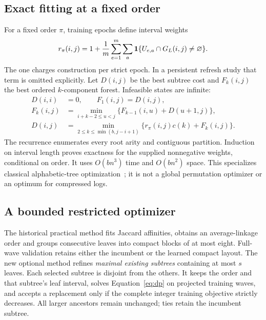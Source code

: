 \documentclass[10pt,journal,compsoc]{IEEEtran}
\theoremstyle{definition}\newtheorem{definition}[theorem]{Definition}
\begin{document}
\subsection{Exact fitting at a fixed order}
For a fixed order $\pi$, training epochs define interval weights
\begin{equation}\label{eq:jweights}
 r_\pi(i,j)=1+\frac1m\sum_{e=1}^m\sum_a
 \mathbf 1\{U_{e,a}\cap G_L(i,j)\ne\varnothing\}.
\end{equation}
The one charges construction per strict epoch. In a persistent refresh study
that term is omitted explicitly.
Let $D(i,j)$ be the best subtree cost and $F_k(i,j)$ the best ordered
$k$-component forest. Infeasible states are infinite:
\begin{align}
 D(i,i)&=0,\qquad F_1(i,j)=D(i,j),\nonumber\\
 F_k(i,j)&=\min_{i+k-2\le u<j}
       \{F_{k-1}(i,u)+D(u+1,j)\},\nonumber\\
 D(i,j)&=\min_{2\le k\le\min(b,j-i+1)}
       \{r_\pi(i,j)c(k)+F_k(i,j)\}.\label{eq:dp}
\end{align}
The recurrence enumerates every root arity and contiguous partition.
Induction on interval length proves exactness for the supplied nonnegative
weights, conditional on order. It uses $O(bn^3)$ time and $O(bn^2)$ space.
This specializes classical alphabetic-tree optimization~\cite{alphabetic};
it is not a global permutation optimizer or an optimum for compressed logs.

\subsection{A bounded restricted optimizer}
The historical practical method fits Jaccard affinities, obtains an
average-linkage order and groups consecutive leaves into compact blocks of
at most eight. Full-wave validation retains either the incumbent or the
learned compact layout. The new optional method refines \emph{maximal existing
subtrees} containing at most $s$ leaves. Each selected subtree is disjoint
from the others. It keeps the order and that subtree's leaf interval, solves
Equation~\eqref{eq:dp} on projected training waves, and accepts a replacement
only if the complete integer training objective strictly decreases.
All larger ancestors remain unchanged; ties retain the incumbent subtree.
\end{document}
